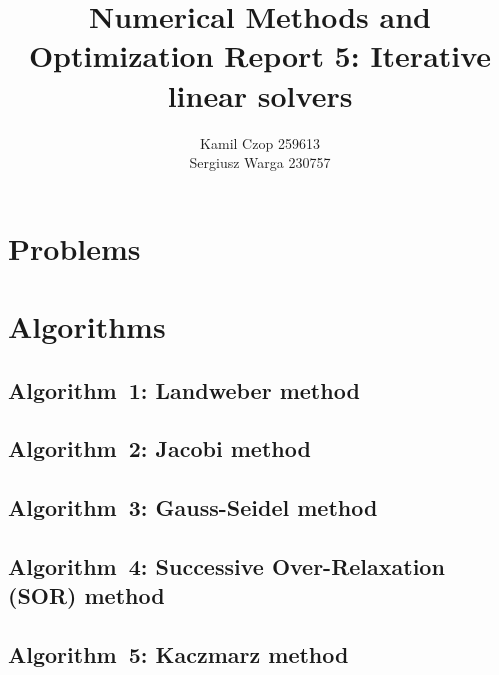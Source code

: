 \documentclass[a4paper]{article}
\title{Numerical Methods and Optimization Report 5:
Iterative linear solvers}
\author{Kamil Czop 259613\\Sergiusz Warga 230757}
\begin{document}
\maketitle
\tableofcontents
\listoftodos
\pagebreak

\section{Problems}



\clearpage

\section{Algorithms}%
\label{sec:algorithms}
\subsection{Algorithm~1: Landweber method}%
\label{algorithm:1}

\subsection{Algorithm~2: Jacobi method}%

% 
\subsection{Algorithm~3: Gauss-Seidel method}%
\label{algorithm:3}



% 
\subsection{Algorithm~4: Successive Over-Relaxation (SOR) method}%
\label{algorithm:4}


\subsection{Algorithm~5: Kaczmarz method}%






\clearpage

\nocite{Zdunek, GoluVanl96, Meyer}


\end{document}
